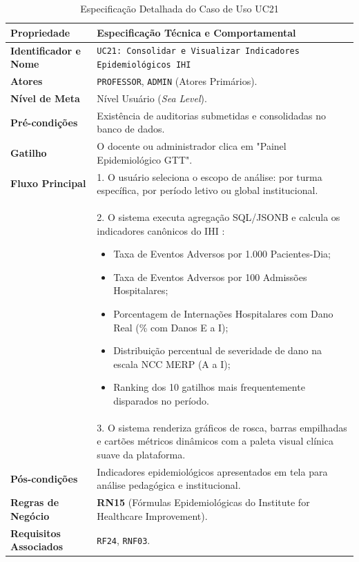 \begin{table}[!ht]
\centering
\caption{Especificação Detalhada do Caso de Uso UC21}
\label{tab_uc21}
\footnotesize
\begin{tabularx}{\textwidth}{p{3.5cm} X}
\toprule
\textbf{Propriedade} & \textbf{Especificação Técnica e Comportamental} \\
\midrule
\textbf{Identificador e Nome} & \texttt{UC21: Consolidar e Visualizar Indicadores Epidemiológicos IHI} \\
\textbf{Atores} & \texttt{PROFESSOR}, \texttt{ADMIN} (Atores Primários). \\
\textbf{Nível de Meta} & Nível Usuário (\textit{Sea Level}). \\
\textbf{Pré-condições} & Existência de auditorias submetidas e consolidadas no banco de dados. \\
\textbf{Gatilho} & O docente ou administrador clica em "Painel Epidemiológico GTT". \\
\textbf{Fluxo Principal} & 
1. O usuário seleciona o escopo de análise: por turma específica, por período letivo ou global institucional.\\
& 2. O sistema executa agregação SQL/JSONB e calcula os indicadores canônicos do IHI \cite{ihi2009}:
\begin{itemize}
    \item Taxa de Eventos Adversos por 1.000 Pacientes-Dia;
    \item Taxa de Eventos Adversos por 100 Admissões Hospitalares;
    \item Porcentagem de Internações Hospitalares com Dano Real (\% com Danos E a I);
    \item Distribuição percentual de severidade de dano na escala NCC MERP (A a I);
    \item Ranking dos 10 gatilhos mais frequentemente disparados no período.
\end{itemize}\\
& 3. O sistema renderiza gráficos de rosca, barras empilhadas e cartões métricos dinâmicos com a paleta visual clínica suave da plataforma. \\
\textbf{Pós-condições} & Indicadores epidemiológicos apresentados em tela para análise pedagógica e institucional. \\
\textbf{Regras de Negócio} & \textbf{RN15} (Fórmulas Epidemiológicas do Institute for Healthcare Improvement). \\
\textbf{Requisitos Associados} & \texttt{RF24}, \texttt{RNF03}. \\
\bottomrule
\end{tabularx}
\end{table}


